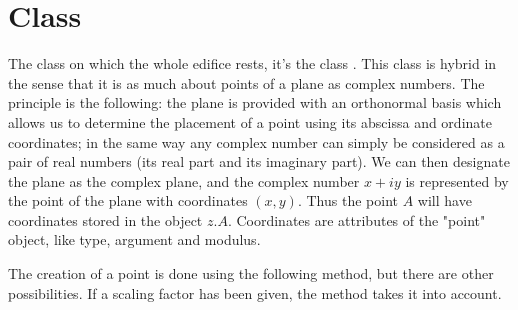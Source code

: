 \newpage

\section{Class } %
\label{sec:class_point}

The class on which the whole edifice rests,  it's the class . This class is hybrid in the sense that it is as much about points of a plane as complex numbers. The principle is the following: the plane is provided with an orthonormal basis which allows us to determine the placement of a point using its abscissa and ordinate coordinates; in the same way any complex number can simply be considered as a pair of real numbers (its real part and its imaginary part). We can then designate the plane as the complex plane, and the complex number $x+iy$ is represented by the point of the plane with coordinates $(x,y)$. Thus the point $A$ will have coordinates stored in the object $z.A$. Coordinates are attributes of the "point" object, like type, argument and modulus.



The creation of a point is done using the following method, but there are other possibilities. If a scaling factor has been given, the method takes it into account.

